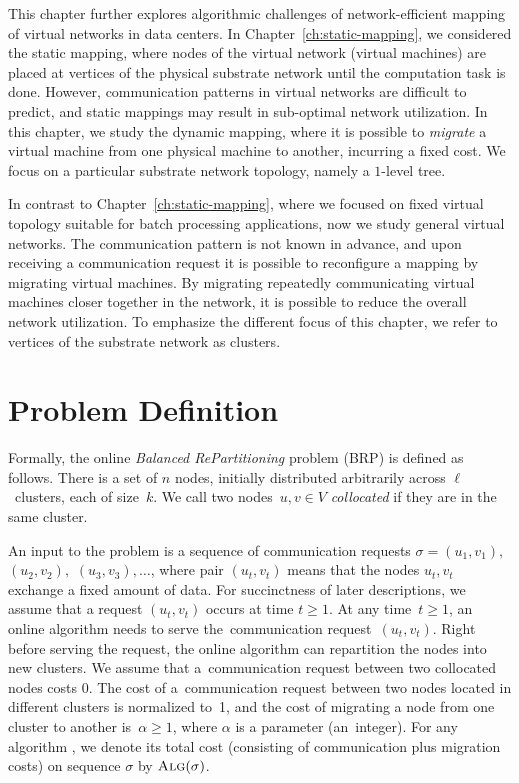 This chapter further explores algorithmic challenges of network-efficient mapping of virtual networks in data centers.
In Chapter~\ref{ch:static-mapping}, we considered the static mapping, where nodes of the virtual network (virtual machines) are placed at vertices of the physical substrate network until the computation task is done.
However, communication patterns in virtual networks are difficult to predict, and static mappings may result in sub-optimal network utilization.
In this chapter, we study the dynamic mapping, where it is possible to \emph{migrate} a virtual machine from one physical machine to another, incurring a fixed cost.
We focus on a particular substrate network topology, namely a $1$-level tree.

In contrast to Chapter~\ref{ch:static-mapping}, where we focused on fixed virtual topology suitable for batch processing applications, now we study general virtual networks.
The communication pattern is not known in advance, and upon receiving a communication request it is possible to reconfigure a mapping by migrating virtual machines.
By migrating repeatedly communicating virtual machines closer together in the network, it is possible to reduce the overall network utilization.
To emphasize the different focus of this chapter, we refer to vertices of the substrate network as clusters.

\section{Problem Definition}


Formally, the online \emph{Balanced RePartitioning} problem (BRP) is defined as
follows. There is a set of $n$ nodes, initially distributed arbitrarily
across $\ell$~clusters, each of size~$k$. We call two nodes~$u,v\in V$
\emph{collocated} if they are in the same cluster.

An input to the problem is a sequence of communication requests $\sigma =
(u_1,v_1),$ $(u_2,v_2),$ $(u_3,v_3), \ldots$, where pair $(u_t,v_t)$ means that
the nodes $u_t,v_t$ exchange a fixed amount of data. For succinctness of later descriptions,
we assume that a request $(u_t,v_t)$ occurs at time $t \geq 1$. At any time~$t
\geq 1$, an online algorithm needs to serve the~communication
request~$(u_t,v_t)$. Right before serving the request, the online algorithm
can repartition the nodes into new clusters. We assume that
a~communication request between two collocated nodes costs 0. The cost of a~communication request between two nodes located in different clusters is
normalized to~1, and the cost of migrating a node from one cluster to another
is~$\alpha \geq 1$, where $\alpha$ is a parameter (an~integer). For any
algorithm \ALG, we denote its total cost (consisting of communication plus
migration costs) on sequence $\sigma$ by $\textsc{Alg}(\sigma)$.


